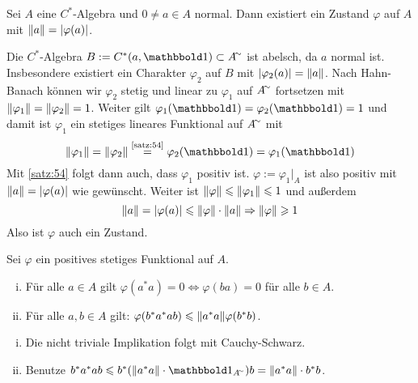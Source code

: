 \begin{satz}[{name=[Existenz von Zuständen zu gegebenen normalen Elementen]},label=satz:55]
	Sei $A$ eine $C^*$-Algebra und $0\neq a \in A$ normal.
	Dann existiert ein Zustand $\varphi$ auf $A$ mit $\norm*{a}=\abs*{\varphi(a)}$.
\end{satz}
\begin{beweis}
	Die $C^*$-Algebra $B := C^*(a, \ind)\subset A^\simm$ ist abelsch, da $a$ normal ist. 
	Insbesondere existiert ein Charakter $\varphi_2$ auf $B$ mit $\abs*{\varphi_2(a)}=\norm*{a}$.
	Nach Hahn-Banach können wir $\varphi_2$ stetig und linear zu $\varphi_1$ auf $A^\simm$ fortsetzen mit $\norm*{\varphi_1} = \norm*{\varphi_2}=1$.
	Weiter gilt $\varphi_1(\ind)= \varphi_2(\ind)=1$ und damit ist $\varphi_1$ ein stetiges lineares Funktional auf $A^\simm$ mit 
	\[
		\norm*{\varphi_1} = \norm*{\varphi_2}\StackText{\ref{satz:54}}{=} \varphi_2(\ind) = \varphi_1(\ind)
	\]
	Mit \autoref{satz:54} folgt dann auch, dass $\varphi_1$ positiv ist. $\varphi := \varphi_1|_A$ ist also positiv mit $\norm*{a}= \abs*{\varphi(a)}$ wie gewünscht.
	Weiter ist $\norm*{\varphi} \le \norm*{\varphi_1} \le 1$ und außerdem 
	\[
		\norm*{a} = \abs*{\varphi(a)} \le \norm*{\varphi} \cdot \norm*{a} \Rightarrow \norm*{\varphi} \ge 1
	\]
	Also ist $\varphi$ auch ein Zustand.
\end{beweis}

\begin{proposition}[label=prop:56,{name=[{positive Funktionale und Elemente der Form $a^*a$}]}]
	Sei $\varphi$ ein positives stetiges Funktional auf $A$. 
	\begin{enumerate}[(i),itemsep=0pt]
		\item Für alle $a \in A$ gilt $\varphi(a^*a)=0 \iff \varphi(ba)=0$ für alle $b \in A$.
		\item Für alle $a,b \in A$ gilt: $\varphi(b^*a^*ab) \le \norm*{a^*a}\varphi(b^*b)$.
	\end{enumerate}
\end{proposition}
\begin{beweis}
	\leavevmode
	\begin{enumerate}[(i),itemsep=0pt]
		\item Die nicht triviale Implikation folgt mit Cauchy-Schwarz.
		\item Benutze $b^*a^*ab \le b^* \enbrace*{\norm*{a^*a} \cdot \ind_{A^\simm}}b = \norm*{a^*a} \cdot b^*b$. \qedhere
	\end{enumerate}
\end{beweis}

